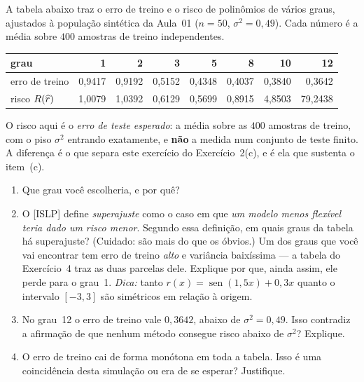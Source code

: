 \documentclass[11pt,a4paper]{article}
\begin{document}
\begin{exercicio}
A tabela abaixo traz o erro de treino e o risco de polinômios de vários graus,
ajustados à população sintética da Aula~01 ($n=50$, $\sigma^2=0{,}49$). Cada
número é a média sobre $400$ amostras de treino independentes.

\begin{center}\small
\renewcommand{\arraystretch}{1.2}
\begin{tabular}{@{}lrrrrrrr@{}}
\toprule
grau                  & 1 & 2 & 3 & 5 & 8 & 10 & 12 \\
\midrule
erro de treino        & 0{,}9417 & 0{,}9192 & 0{,}5152 & 0{,}4348 & 0{,}4037 & 0{,}3840 & 0{,}3642 \\
risco $R(\widehat{r})$ & 1{,}0079 & 1{,}0392 & 0{,}6129 & 0{,}5699 & 0{,}8915 & 4{,}8503 & 79{,}2438 \\
\bottomrule
\end{tabular}

\smallskip
\begin{minipage}{0.92\textwidth}\footnotesize
O risco aqui é o \emph{erro de teste esperado}: a média sobre as $400$ amostras de
treino, com o piso $\sigma^2$ entrando exatamente, e \textbf{não} a medida num
conjunto de teste finito. A diferença é o que separa este exercício do
Exercício~2(c), e é ela que sustenta o item~(c).
\end{minipage}
\end{center}

\begin{enumerate}[label=(\alph*),leftmargin=1.1cm]
  \item Que grau você escolheria, e por quê?
  \item O [ISLP] define \emph{superajuste} como o caso em que \emph{um modelo menos
        flexível teria dado um risco menor}. Segundo essa definição, em quais graus
        da tabela há superajuste? (Cuidado: são mais do que os óbvios.) Um dos graus
        que você vai encontrar tem erro de treino \emph{alto} e variância baixíssima
        --- a tabela do Exercício~4 traz as duas parcelas dele. Explique por que,
        ainda assim, ele perde para o grau~1. \emph{Dica:} tanto
        $r(x)=\operatorname{sen}(1{,}5x)+0{,}3x$ quanto o intervalo $[-3,3]$ são
        simétricos em relação à origem.
  \item No grau~12 o erro de treino vale $0{,}3642$, abaixo de $\sigma^2=0{,}49$.
        Isso contradiz a afirmação de que nenhum método consegue risco abaixo de
        $\sigma^2$? Explique.
  \item O erro de treino cai de forma monótona em toda a tabela. Isso é uma
        coincidência desta simulação ou era de se esperar? Justifique.
\end{enumerate}
\end{exercicio}
\end{document}
